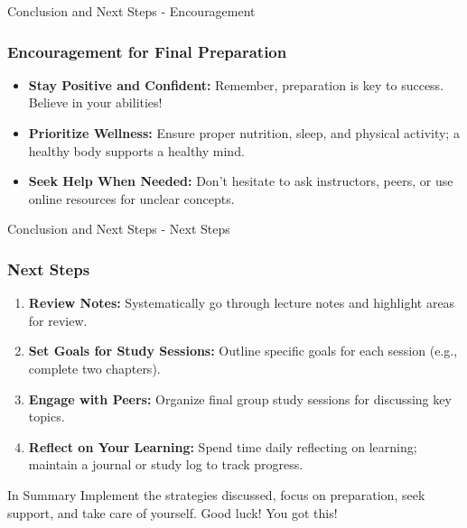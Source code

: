 \documentclass[aspectratio=169]{beamer}
\begin{document}
\begin{frame}[fragile]{Conclusion and Next Steps - Encouragement}
    \frametitle{Encouragement for Final Preparation}

    \begin{itemize}
        \item \textbf{Stay Positive and Confident:} 
        Remember, preparation is key to success. Believe in your abilities!
        
        \item \textbf{Prioritize Wellness:}
        Ensure proper nutrition, sleep, and physical activity; a healthy body supports a healthy mind.
        
        \item \textbf{Seek Help When Needed:} 
        Don't hesitate to ask instructors, peers, or use online resources for unclear concepts.
    \end{itemize}
    
\end{frame}

\begin{frame}[fragile]{Conclusion and Next Steps - Next Steps}
    \frametitle{Next Steps}

    \begin{enumerate}
        \item \textbf{Review Notes:}
        Systematically go through lecture notes and highlight areas for review.

        \item \textbf{Set Goals for Study Sessions:}
        Outline specific goals for each session (e.g., complete two chapters).
        
        \item \textbf{Engage with Peers:}
        Organize final group study sessions for discussing key topics.

        \item \textbf{Reflect on Your Learning:}
        Spend time daily reflecting on learning; maintain a journal or study log to track progress.
    \end{enumerate}

    \begin{block}{In Summary}
        Implement the strategies discussed, focus on preparation, seek support, and take care of yourself. Good luck! You got this!
    \end{block}
    
\end{frame}
\end{document}
